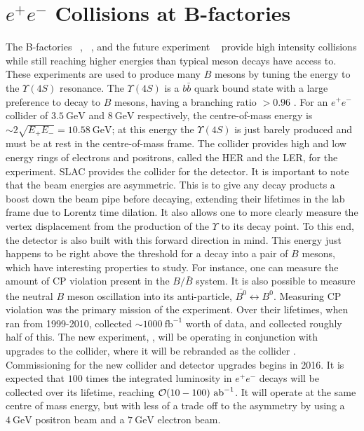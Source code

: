 \section{$e^+ e^-$ Collisions at B-factories}
\label{sec:ee_experiment}
The B-factories \babar~\cite{Boutigny:1995ib}, \belle~\cite{Cheng:1995im}, and the future experiment \belletwo~\cite{Abe:2010gxa} provide high intensity collisions while still reaching higher energies than typical meson decays have access to.
These experiments are used to produce many $B$ mesons by tuning the energy to the $\Upsilon(4S)$ resonance.
The $\Upsilon(4S)$ is a $b\bar{b}$ quark bound state with a large preference to decay to $B$ mesons, having a branching ratio $> 0.96$ \cite{Agashe:2014kda}.
For an $e^+ e^-$ collider of $3.5~\textrm{GeV}$ and $8~\textrm{GeV}$ respectively, the centre-of-mass energy is $\sim 2\sqrt{E_+ E_-} = 10.58~\textrm{GeV}$; at this energy the $\Upsilon(4S)$ is just barely produced and must be at rest in the centre-of-mass frame.
The \kekb collider provides high and low energy rings of electrons and positrons, called the HER and the LER, for the \belle experiment.
SLAC provides the collider for the \babar detector.
It is important to note that the beam energies are asymmetric.
This is to give any decay products a boost down the beam pipe before decaying, extending their lifetimes in the lab frame due to Lorentz time dilation.
It also allows one to more clearly measure the vertex displacement from the production of the $\Upsilon$ to its decay point.
To this end, the detector is also built with this forward direction in mind.
This energy just happens to be right above the threshold for a decay into a pair of $B$ mesons, which have interesting properties to study. For instance, one can measure the amount of CP violation present in the $B/\bar{B}$ system.
It is also possible to measure the neutral $B$ meson oscillation into its anti-particle, $\bar{B^0} \leftrightarrow B^0$.
Measuring CP violation was the primary mission of the \babar experiment.
Over their lifetimes, when \belle ran from 1999-2010, \belle collected $\sim 1000~\textrm{fb}^{-1}$ worth of data, and \babar collected roughly half of this.
The new experiment, \belletwo, will be operating in conjunction with upgrades to the \kekb collider, where it will be rebranded as the \superkekb collider \cite{Akeroyd:2004mj}.
Commissioning for the new collider and detector upgrades begins in 2016.
It is expected that $100$ times the integrated luminosity in $e^+ e^-$ decays will be collected over its lifetime, reaching $\operatorname{\mathcal{O}}(10-100)~\textrm{ab}^{-1}$.
It will operate at the same centre of mass energy, but with less of a trade off to the asymmetry by using a $4~\textrm{GeV}$ positron beam and a $7~\textrm{GeV}$ electron beam.

